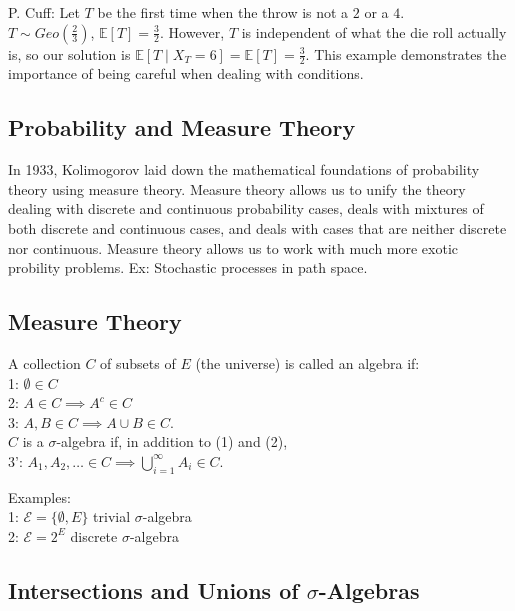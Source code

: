 \documentclass[english, course]{Notes}
\begin{document}
P. Cuff: Let $T$ be the first time when the throw is not a $2$ or a $4$.\\

$T \sim Geo(\frac{2}{3})$, $\mathbb{E}[T] = \frac{3}{2}$. However, $T$ is independent of what the die roll actually is, so our solution is $\mathbb{E}[T \mid X_T = 6] = \mathbb{E}[T] = \frac{3}{2}$. This example demonstrates the importance of being careful when dealing with conditions.\\

\subsection{Probability and Measure Theory}

In 1933, Kolimogorov laid down the mathematical foundations of probability theory using measure theory. Measure theory allows us to unify the theory dealing with discrete and continuous probability cases, deals with mixtures of both discrete and continuous cases, and deals with cases that are neither discrete nor continuous. Measure theory allows us to work with much more exotic probility problems. Ex: Stochastic processes in path space.\\

\subsection{Measure Theory}

\begin{definition}
A collection $C$ of subsets of $E$ (the universe) is called an algebra if:\\
1: $\emptyset \in C$\\
2: $A \in C \implies A^c \in C$\\
3: $A, B \in C \implies A \cup B \in C$.\\

$C$ is a $\sigma$-algebra if, in addition to (1) and (2),\\
3': $A_1, A_2, \dots \in C \implies \bigcup^\infty_{i = 1}A_i \in C$.
\end{definition}

Examples:\\
1: $\mathcal{E} = \{\emptyset, E\}$ trivial $\sigma$-algebra\\
2: $\mathcal{E} = 2^E$ discrete $\sigma$-algebra

\subsection{Intersections and Unions of $\sigma$-Algebras}
\end{document}
